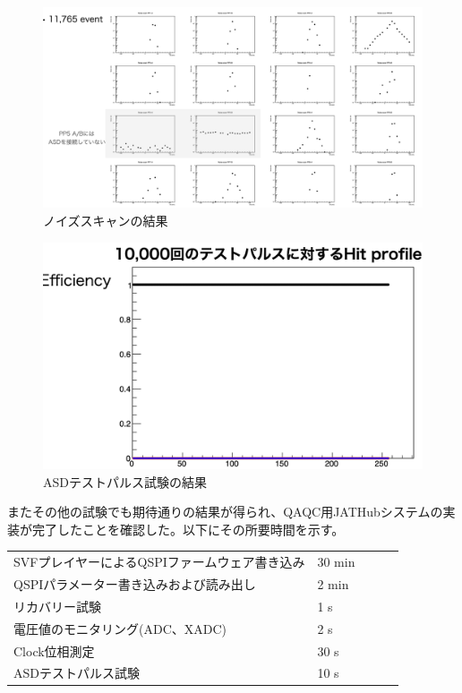 \begin{figure} 
\centering
\includegraphics[width=16cm]{fig/QAQCnoisescan.png}
\caption[ノイズスキャン]{ノイズスキャンの結果}
\label{QAQCnoisescan}
\end{figure}

\begin{figure} 
\centering
\includegraphics[width=16cm]{fig/QAQCresult.png}
\caption[ASDテストパルスの結果]{ASDテストパルス試験の結果}
\label{QAQCresult}
\end{figure}

またその他の試験でも期待通りの結果が得られ、QAQC用JATHubシステムの実装が完了したことを確認した。以下にその所要時間を示す。

\begin{table}[]
    \begin{tabular}{lllll}
    SVFプレイヤーによるQSPIファームウェア書き込み    & 30 min &  &  &  \\
    QSPIパラメーター書き込みおよび読み出し         & 2 min  &  &  &  \\
    リカバリー試験                       & 1 s    &  &  &  \\
    電圧値のモニタリング(ADC、XADC) & 2 s    &  &  &  \\
    Clock位相測定                     & 30 s   &  &  &  \\
    ASDテストパルス試験                   & 10 s   &  &  & 
    \end{tabular}
\end{table}

